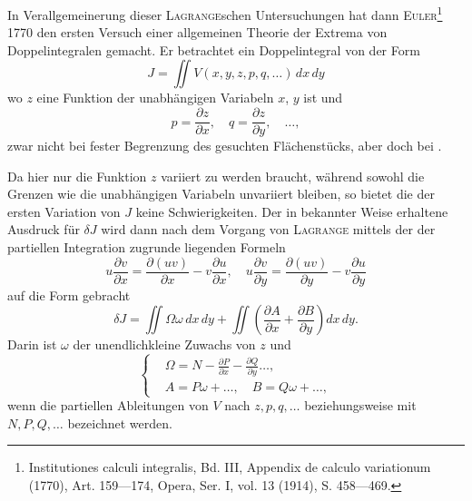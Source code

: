 In Verallgemeinerung dieser \textsc{Lagrange}schen Untersuchungen hat dann
\textsc{Euler}\footnote{Institutiones calculi integralis, Bd. III, Appendix de calculo variationum (1770), Art. 159—174, Opera, Ser. I, vol. 13 (1914), S. 458—469.}
1770 den ersten Versuch einer allgemeinen Theorie der Extrema
von Doppelintegralen gemacht. Er betrachtet ein Doppelintegral von der Form
\begin{equation*}
J=\iint V(x,y,z,p,q,\ldots)\,dx\,dy\tag{1}
\end{equation*}
wo $z$ eine Funktion der unabhängigen Variabeln $x$, $y$ ist und
\[
p=\frac{\partial z}{\partial x},\quad q=\frac{\partial z}{\partial y},\quad\ldots,
\]
zwar nicht bei fester Begrenzung des gesuchten Flächenstücks, aber doch bei
.
\par\clearpage{}
\noindent\hspace*{\parindent}Da hier nur die Funktion $z$ variiert zu werden braucht, während sowohl
die Grenzen wie die unabhängigen Variabeln unvariiert bleiben, so bietet die
 der ersten Variation von $J$ keine Schwierigkeiten. Der in bekannter
Weise erhaltene Ausdruck für $\delta J$ wird dann nach dem Vorgang von
\textsc{Lagrange} mittels der der partiellen Integration zugrunde liegenden Formeln
\begin{equation*}
u\frac{\partial v}{\partial x}=\frac{\partial(uv)}{\partial x}-v\frac{\partial u}{\partial x},\quad
u\frac{\partial v}{\partial y}=\frac{\partial(uv)}{\partial y}-v\frac{\partial u}{\partial y}\tag{2}
\end{equation*}
auf die Form gebracht
\begin{equation*}
\delta J=\iint\Omega\omega\,dx\,dy+\iint\left(\frac{\partial A}{\partial x}+\frac{\partial B}{\partial y}\right)dx\,dy.\tag{3}
\end{equation*}
Darin ist $\omega$ der unendlichkleine Zuwachs von $z$ und
\begin{equation*}
\left\{\begin{aligned}
&\Omega=N-\frac{\partial P}{\partial x}-\frac{\partial Q}{\partial y}\ldots,\\
&A=P\omega+\ldots,\quad B=Q\omega+\ldots,
\end{aligned}\right.\tag{4}
\end{equation*}
wenn die partiellen Ableitungen von $V$ nach $z,p,q,\ldots$ beziehungsweise mit
$N,P,Q,\ldots$ bezeichnet werden.

